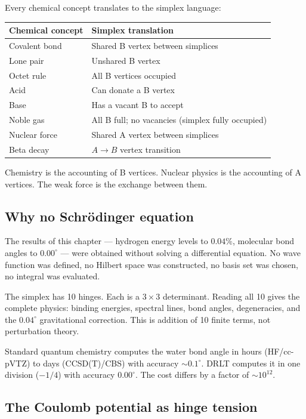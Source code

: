 Every chemical concept translates to the simplex language:

\begin{center}
\begin{tabular}{ll}
\hline
Chemical concept & Simplex translation \\
\hline
Covalent bond & Shared B vertex between simplices \\
Lone pair & Unshared B vertex \\
Octet rule & All B vertices occupied \\
Acid & Can donate a B vertex \\
Base & Has a vacant B to accept \\
Noble gas & All B full; no vacancies (simplex fully occupied) \\
Nuclear force & Shared A vertex between simplices \\
Beta decay & $A \to B$ vertex transition \\
\hline
\end{tabular}
\end{center}

Chemistry is the accounting of B vertices. Nuclear physics is the accounting of A vertices. The weak force is the exchange between them.

\subsection{Why no Schr\"odinger equation}

The results of this chapter --- hydrogen energy levels to $0.04\%$, molecular bond angles to $0.00^\circ$ --- were obtained without solving a differential equation. No wave function was defined, no Hilbert space was constructed, no basis set was chosen, no integral was evaluated.

The simplex has 10 hinges. Each is a $3 \times 3$ determinant. Reading all 10 gives the complete physics: binding energies, spectral lines, bond angles, degeneracies, and the $0.04^\circ$ gravitational correction. This is addition of 10 finite terms, not perturbation theory.

Standard quantum chemistry computes the water bond angle in hours (HF/cc-pVTZ) to days (CCSD(T)/CBS) with accuracy $\sim 0.1^\circ$. DRLT computes it in one division ($-1/4$) with accuracy $0.00^\circ$. The cost differs by a factor of $\sim 10^{12}$.

\subsection{The Coulomb potential as hinge tension}
\label{sec:coulomb_hinge}

